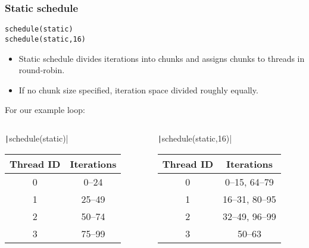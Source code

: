 \documentclass{beamer}
\begin{document}
\begin{frame}[fragile]
\frametitle{Static schedule}
\begin{verbatim}
schedule(static)
schedule(static,16)
\end{verbatim}

\begin{itemize}
\item Static schedule divides iterations into chunks and assigns chunks to threads in round-robin.
\item If no chunk size specified, iteration space divided roughly equally.
\end{itemize}
For our example loop:
\begin{columns}
\begin{column}{0.5\textwidth}
  \texttt|schedule(static)|
  \begin{tabular}{cc}
  \toprule
  Thread ID & Iterations \\
  \midrule
  0 &  0--24 \\
  1 & 25--49 \\
  2 & 50--74 \\
  3 & 75--99 \\
  \bottomrule
  \end{tabular}
\end{column}

\begin{column}{0.5\textwidth}
  \texttt|schedule(static,16)|
  \begin{tabular}{cc}
  \toprule
  Thread ID & Iterations \\
  \midrule
  0 &  0--15, 64--79 \\
  1 & 16--31, 80--95 \\
  2 & 32--49, 96--99 \\
  3 & 50--63 \\
  \bottomrule
  \end{tabular}
\end{column}
\end{columns}

\end{frame}
\end{document}
